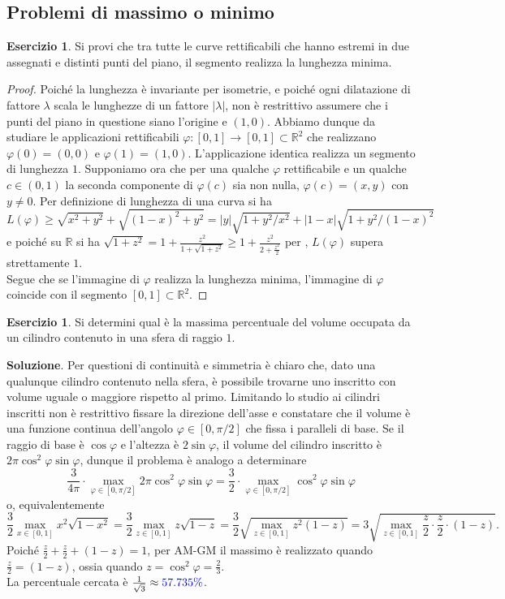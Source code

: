 \documentclass[a4paper,twoside]{article}
\newcommand{\R}{\mathbb{R}}
\theoremstyle{definition}
\newtheorem{ex}[theorem]{Esercizio}
\numberwithin{theorem}{section}
\begin{document}
\newpage

\subsection{Problemi di massimo o minimo}

\begin{shaded}
\begin{ex} Si provi che tra tutte le curve rettificabili che hanno estremi in due assegnati e distinti punti del piano, il segmento realizza la lunghezza minima. 
\end{ex}
\end{shaded}
\begin{proof} Poiché la lunghezza è invariante per isometrie, e poiché ogni dilatazione di fattore $\lambda$ scala le lunghezze di un fattore $|\lambda|$, non è restrittivo assumere che i punti del piano in questione siano l'origine e $(1,0)$. Abbiamo dunque da studiare le applicazioni rettificabili $\varphi:[0,1]\to[0,1]\subset\R^2$ che realizzano $\varphi(0)=(0,0)$ e $\varphi(1)=(1,0)$. L'applicazione identica realizza un segmento di lunghezza $1$. Supponiamo ora che per una qualche $\varphi$ rettificabile e un qualche $c\in(0,1)$ la seconda componente di $\varphi(c)$ sia non nulla, $\varphi(c)=(x,y)$ con $y\neq 0$. Per definizione di lunghezza di una curva si ha 
$$ L(\varphi) \geq \sqrt{x^2+y^2}+\sqrt{(1-x)^2+y^2}=|y|\sqrt{1+y^2/x^2}+|1-x|\sqrt{1+y^2/(1-x)^2} $$
e poiché su $\R$ si ha $\sqrt{1+z^2}=1+\frac{z^2}{1+\sqrt{1+z^2}}\geq 1+\frac{z^2}{2+\frac{z^2}{2}}$ per , $L(\varphi)$ supera strettamente $1$.\\
Segue che se l'immagine di $\varphi$ realizza la lunghezza minima, l'immagine di $\varphi$ coincide con il segmento $[0,1]\subset\R^2$.
\end{proof}

\begin{ex} Si determini qual è la massima percentuale del volume occupata da un cilindro contenuto in una sfera di raggio $1$. 
\end{ex}
\textbf{Soluzione}. Per questioni di continuità e simmetria è chiaro che, dato una qualunque cilindro contenuto nella sfera, è possibile trovarne uno inscritto con volume uguale o maggiore rispetto al primo. Limitando lo studio ai cilindri inscritti non è restrittivo fissare la direzione dell'asse e constatare che il volume è una funzione continua dell'angolo $\varphi\in[0,\pi/2]$ che fissa i paralleli di base. Se il raggio di base è $\cos\varphi$ e l'altezza è $2\sin\varphi$, il volume del cilindro inscritto è $2\pi\cos^2\varphi\sin\varphi$, dunque il problema è analogo a determinare 
$$ \frac{3}{4\pi}\cdot\max_{\varphi\in[0,\pi/2]}2\pi\cos^2\varphi\sin\varphi = \frac{3}{2}\cdot\max_{\varphi\in[0,\pi/2]}\cos^2\varphi\sin\varphi$$
o, equivalentemente 
$$ \frac{3}{2}\max_{x\in[0,1]} x^2\sqrt{1-x^2}=\frac{3}{2}\max_{z\in[0,1]} z\sqrt{1-z} = \frac{3}{2}\sqrt{\max_{z\in[0,1]}z^2(1-z)}=3\sqrt{\max_{z\in[0,1]}\frac{z}{2}\cdot\frac{z}{2}\cdot(1-z)}. $$
Poiché $\frac{z}{2}+\frac{z}{2}+(1-z)=1$, per AM-GM il massimo è realizzato quando $\frac{z}{2}=(1-z)$, ossia quando $z=\cos^2\varphi=\frac{2}{3}$.\\ La percentuale cercata è $\frac{1}{\sqrt{3}}\approx {\color{blue}57.735\%}$.
\end{document}
